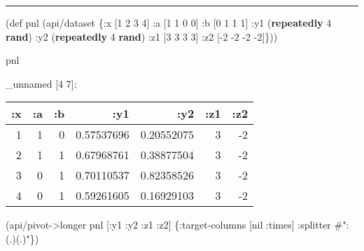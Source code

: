 \documentclass[]{article}
\newenvironment{Shaded}{\begin{snugshade}}{\end{snugshade}}
\newcommand{\KeywordTok}[1]{\textcolor[rgb]{0.13,0.29,0.53}{\textbf{#1}}}
\newcommand{\DecValTok}[1]{\textcolor[rgb]{0.00,0.00,0.81}{#1}}
\newcommand{\SpecialStringTok}[1]{\textcolor[rgb]{0.31,0.60,0.02}{#1}}
\newcommand{\FunctionTok}[1]{\textcolor[rgb]{0.00,0.00,0.00}{#1}}
\newcommand{\VariableTok}[1]{\textcolor[rgb]{0.00,0.00,0.00}{#1}}
\newcommand{\BuiltInTok}[1]{#1}
\newcommand{\AttributeTok}[1]{\textcolor[rgb]{0.77,0.63,0.00}{#1}}
\newcommand{\NormalTok}[1]{#1}
\begin{document}
\begin{center}\rule{0.5\linewidth}{0.5pt}\end{center}

\begin{Shaded}
\begin{Highlighting}[]
\NormalTok{(}\BuiltInTok{def}\FunctionTok{ pnl }\NormalTok{(api/dataset \{}\AttributeTok{:x}\NormalTok{ [}\DecValTok{1} \DecValTok{2} \DecValTok{3} \DecValTok{4}\NormalTok{]}
                       \AttributeTok{:a}\NormalTok{ [}\DecValTok{1} \DecValTok{1} \DecValTok{0} \DecValTok{0}\NormalTok{]}
                       \AttributeTok{:b}\NormalTok{ [}\DecValTok{0} \DecValTok{1} \DecValTok{1} \DecValTok{1}\NormalTok{]}
                       \AttributeTok{:y1}\NormalTok{ (}\KeywordTok{repeatedly} \DecValTok{4} \KeywordTok{rand}\NormalTok{)}
                       \AttributeTok{:y2}\NormalTok{ (}\KeywordTok{repeatedly} \DecValTok{4} \KeywordTok{rand}\NormalTok{)}
                       \AttributeTok{:z1}\NormalTok{ [}\DecValTok{3} \DecValTok{3} \DecValTok{3} \DecValTok{3}\NormalTok{]}
                       \AttributeTok{:z2}\NormalTok{ [-}\DecValTok{2} \DecValTok{-2} \DecValTok{-2} \DecValTok{-2}\NormalTok{]\}))}
\end{Highlighting}
\end{Shaded}

\begin{Shaded}
\begin{Highlighting}[]
\NormalTok{pnl}
\end{Highlighting}
\end{Shaded}

\_unnamed {[}4 7{]}:

\begin{longtable}[]{@{}rrrrrrr@{}}
\toprule
:x & :a & :b & :y1 & :y2 & :z1 & :z2\tabularnewline
\midrule
\endhead
1 & 1 & 0 & 0.57537696 & 0.20552075 & 3 & -2\tabularnewline
2 & 1 & 1 & 0.67968761 & 0.38877504 & 3 & -2\tabularnewline
3 & 0 & 1 & 0.70110537 & 0.82358526 & 3 & -2\tabularnewline
4 & 0 & 1 & 0.59261605 & 0.16929103 & 3 & -2\tabularnewline
\bottomrule
\end{longtable}

\begin{Shaded}
\begin{Highlighting}[]
\NormalTok{(api/pivot->longer pnl [}\AttributeTok{:y1} \AttributeTok{:y2} \AttributeTok{:z1} \AttributeTok{:z2}\NormalTok{] \{}\AttributeTok{:target-columns}\NormalTok{ [}\VariableTok{nil} \AttributeTok{:times}\NormalTok{]}
                                          \AttributeTok{:splitter} \SpecialStringTok{#":(.)(.)"}\NormalTok{\})}
\end{Highlighting}
\end{Shaded}
\end{document}
